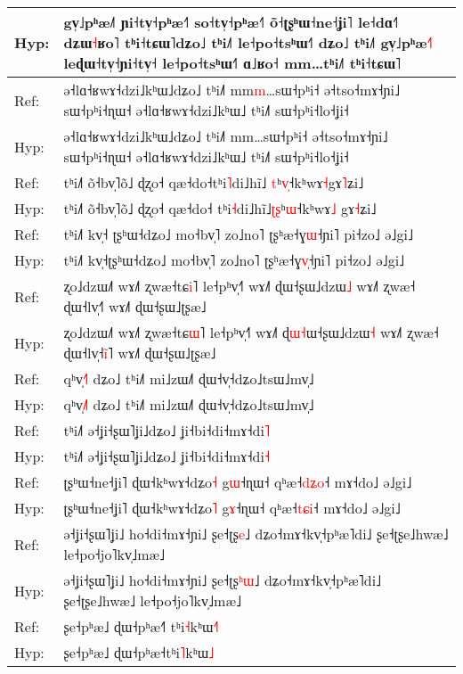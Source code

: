 \documentclass[10pt]{article}
\DeclareRobustCommand{\hl}[1]{{\textcolor{red}{#1}}}
\begin{document}
\begin{longtable}{ll}
Hyp: & gv̩˩pʰæ˩˥ ɲi˧tv̩˧pʰæ˧˥ so˧tv̩˧pʰæ˧˥ õ˧ʈʂʰɯ˧ne˧ʝi˥ le˧dɑ˧˥ dʑɯ\hl{˧}ʁo˥ tʰi˧tɕɯ˥dʑo˩ tʰi˩˥ le˧po˧tsʰɯ˧˥ dʑo˩ tʰi˩˥ gv̩˩pʰæ\hl{˧}˥ leɖɯ˧tv̩˧ɲi˧tv̩˧ le˧po˧tsʰɯ˧˥ ɑ˩ʁo˧ mm…tʰi˩˥ tʰi˧tɕɯ˥ \\ 
\midrule 
Ref: & ə˧lɑ˧ʁwɤ˧dzi˩kʰɯ˩dʑo˩ tʰi˩˥ mm\hl{m}…sɯ˧pʰi˧ ə˧tso˧mɤ˧ɲi˩ sɯ˧pʰi˧ɳɯ˧ ə˧lɑ˧ʁwɤ˧dzi˩kʰɯ˩ tʰi˩˥ sɯ˧pʰi˧lo˧ʝi˧ \\ 
Hyp: & ə˧lɑ˧ʁwɤ˧dzi˩kʰɯ˩dʑo˩ tʰi˩˥ mm…sɯ˧pʰi˧ ə˧tso˧mɤ˧ɲi˩ sɯ˧pʰi˧ɳɯ˧ ə˧lɑ˧ʁwɤ˧dzi˩kʰɯ˩ tʰi˩˥ sɯ˧pʰi˧lo˧ʝi˧ \\ 
\midrule 
Ref: & tʰi˩˥ õ˧bv̩˥õ˩ ɖʐo˧ qæ˧do˧tʰi\hl{˥}di˩hĩ˩\hl{ }\hl{t}ʰ\hl{v}\hl{̩}˧kʰwɤ\hl{˧}gɤ\hl{˥}ʑi˩ \\ 
Hyp: & tʰi˩˥ õ˧bv̩˥õ˩ ɖʐo˧ qæ˧do˧\hl{ }tʰi\hl{˧}di˩hĩ˩\hl{ʈ}\hl{ʂ}ʰ\hl{ɯ}˧kʰwɤ\hl{˩}\hl{ }gɤ\hl{˧}ʑi˩ \\ 
\midrule 
Ref: & tʰi˩˥ kv̩˧\hl{ }ʈʂʰɯ˧dʑo˩ mo˧bv̩˥ zo˩no˥ ʈʂʰæ˧ɣ\hl{ɯ}˧ɲi˥ pi˧zo˩ ə˩gi˩ \\ 
Hyp: & tʰi˩˥ kv̩˧ʈʂʰɯ˧dʑo˩ mo˧bv̩˥ zo˩no˥ ʈʂʰæ˧ɣ\hl{v}\hl{̩}˧ɲi˥ pi˧zo˩ ə˩gi˩ \\ 
\midrule 
Ref: & ʐo˩dzɯ˩˥ wɤ˩˥ ʐwæ˧tɕ\hl{i}˥ le˧pʰv̩˧˥ wɤ˩˥ ɖɯ˧ʂɯ˩dzɯ\hl{˩} wɤ˩˥ ʐwæ˧ ɖɯ˧lv̩˧˥ wɤ˩˥ ɖɯ˧ʂɯ˩ʈʂæ˩ \\ 
Hyp: & ʐo˩dzɯ˩˥ wɤ˩˥ ʐwæ˧tɕ\hl{ɯ}˥ le˧pʰv̩˧˥ wɤ˩˥ ɖ\hl{ɯ}\hl{˧}ɯ˧ʂɯ˩dzɯ\hl{˧} wɤ˩˥ ʐwæ˧ ɖɯ˧lv̩˧\hl{i}\hl{̃}˥ wɤ˩˥ ɖɯ˧ʂɯ˩ʈʂæ˩ \\ 
\midrule 
Ref: & qʰv̩\hl{˧}˥ dʑo˩ tʰi˩˥ mi˩zɯ˩˥ ɖɯ˧v̩˧dʑo˩tsɯ˩mv̩˩ \\ 
Hyp: & qʰv̩\hl{˩}˥ dʑo˩ tʰi˩˥ mi˩zɯ˩˥ ɖɯ˧v̩˧dʑo˩tsɯ˩mv̩˩ \\ 
\midrule 
Ref: & tʰi˩˥ ə˧ʝi˧ʂɯ˥ʝi˩dʑo˩ ʝi˧bi˧di˧mɤ˧di\hl{˥} \\ 
Hyp: & tʰi˩˥ ə˧ʝi˧ʂɯ˥ʝi˩dʑo˩ ʝi˧bi˧di˧mɤ˧di\hl{˧} \\ 
\midrule 
Ref: & ʈʂʰɯ˧ne˧ʝi˥ ɖɯ˧kʰwɤ˧dʑo\hl{˧} g\hl{ɯ}˧ɳɯ˧ qʰæ˧\hl{d}\hl{ʑ}\hl{o}˧ mɤ˧do˩ ə˩gi˩ \\ 
Hyp: & ʈʂʰɯ˧ne˧ʝi˥ ɖɯ˧kʰwɤ˧dʑo\hl{˥} g\hl{ɤ}˧ɳɯ˧ qʰæ˧\hl{t}\hl{ɕ}\hl{i}˧ mɤ˧do˩ ə˩gi˩ \\ 
\midrule 
Ref: & ə˧ʝi˧ʂɯ˥ʝi˩ ho˧di˧mɤ˧ɲi˩ ʂe˧ʈʂ\hl{e}˩ dʑo˧mɤ˧kv̩˧pʰæ˥di˩ ʂe˧ʈʂe˩hwæ˩ le˧po˧jo˥kv̩˩mæ˩ \\ 
Hyp: & ə˧ʝi˧ʂɯ˥ʝi˩ ho˧di˧mɤ˧ɲi˩ ʂe˧ʈʂ\hl{ʰ}\hl{ɯ}˩ dʑo˧mɤ˧kv̩˧pʰæ˥di˩ ʂe˧ʈʂe˩hwæ˩ le˧po˧jo˥kv̩˩mæ˩ \\ 
\midrule 
Ref: & ʂe˧pʰæ˩ ɖɯ˧pʰæ˧\hl{˥}\hl{ }tʰi\hl{˧}kʰɯ\hl{˧}\hl{˥} \\ 
Hyp: & ʂe˧pʰæ˩ ɖɯ˧pʰæ˧tʰi\hl{˥}kʰɯ\hl{˩} \\ 

\end{longtable}
\end{document}
